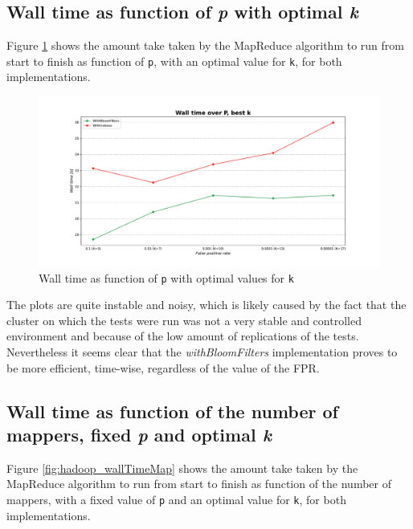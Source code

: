 \subsection*{Wall time as function of \textit{p} with optimal \textit{k}}

Figure \ref{fig:hadoop_wallTimeP_bestK} shows the amount take taken by the MapReduce algorithm to run from start to finish as function of \texttt{p}, with an optimal value for \texttt{k}, for both implementations.\\

\begin{figure}[H]
    \begin{center}
        \includegraphics[scale=.45,trim={3cm 0 3cm 0},clip]{img/hadoop_wallTimeP_bestK.pdf}
    \end{center}
    \vspace*{-0.5cm}
    \caption{Wall time as function of \texttt{p} with optimal values for \texttt{k}}
    \label{fig:hadoop_wallTimeP_bestK}
\end{figure}

The plots are quite instable and noisy, which is likely caused by the fact that the cluster on which the tests were run was not a very stable and controlled environment and because of the low amount of replications of the tests.\\
Nevertheless it seems clear that the \textit{withBloomFilters} implementation proves to be more efficient, time-wise, regardless of the value of the FPR.

\subsection*{Wall time as function of the number of mappers, fixed \textit{p} and optimal \textit{k}}

Figure \ref{fig:hadoop_wallTimeMap} shows the amount take taken by the MapReduce algorithm to run from start to finish as function of the number of mappers, with a fixed value of \texttt{p} and an optimal value for \texttt{k}, for both implementations.\\

